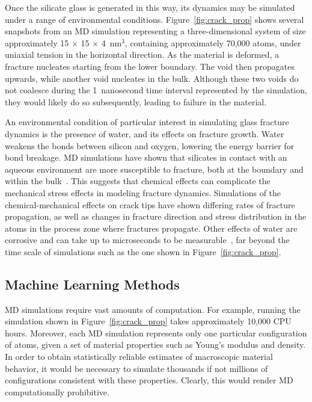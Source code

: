 Once the silicate glass is generated in this way, its dynamics may be simulated under a range of environmental conditions.  Figure~\ref{fig:crack_prop} shows several snapshots from an MD simulation representing a three-dimensional system of size approximately 15 $\times$ 15 $\times$ 4~nm$^3$, containing approximately 70,000 atoms, under uniaxial tension in the horizontal direction.  As the material is deformed, a fracture nucleates starting from the lower boundary.  The void then propagates upwards, while another void nucleates in the bulk.  Although these two voids do not coalesce during the 1~nanosecond time interval represented by the simulation, they would likely do so subsequently, leading to failure in the material.

An environmental condition of particular interest in simulating glass fracture dynamics is the presence of water, and its effects on fracture growth. Water weakens the bonds between silicon and oxygen, lowering the energy barrier for bond breakage. MD simulations have shown that silicates in contact with an aqueous environment are more susceptible to fracture, both at the boundary and within the bulk~\cite{chem_effects}. This suggests that chemical effects can complicate the mechanical stress effects in modeling fracture dynamics. Simulations of the chemical-mechanical effects on crack tips have shown differing rates of fracture propagation, as well as changes in fracture direction and stress distribution in the atoms in the process zone where fractures propagate. Other effects of water are corrosive and can take up to microseconds to be measurable~\cite{markpres}, far beyond the time scale of simulations such as the one shown in Figure~\ref{fig:crack_prop}.

\subsection{Machine Learning Methods} 

MD simulations require vast amounts of computation. For example, running the simulation shown in Figure~\ref{fig:crack_prop} takes approximately 10,000 CPU hours. Moreover, each MD simulation represents only one particular configuration of atoms, given a set of material properties such as Young's modulus and density. In order to obtain statistically reliable estimates of macroscopic material behavior, it would be necessary to simulate thousands if not millions of configurations consistent with these properties.  Clearly, this would render MD computationally prohibitive.

